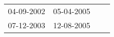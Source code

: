 \begin{supertabular}{llll}
 04-09-2002 &  05-04-2005 \\
 07-12-2003 &  12-08-2005 \\
\end{supertabular}
